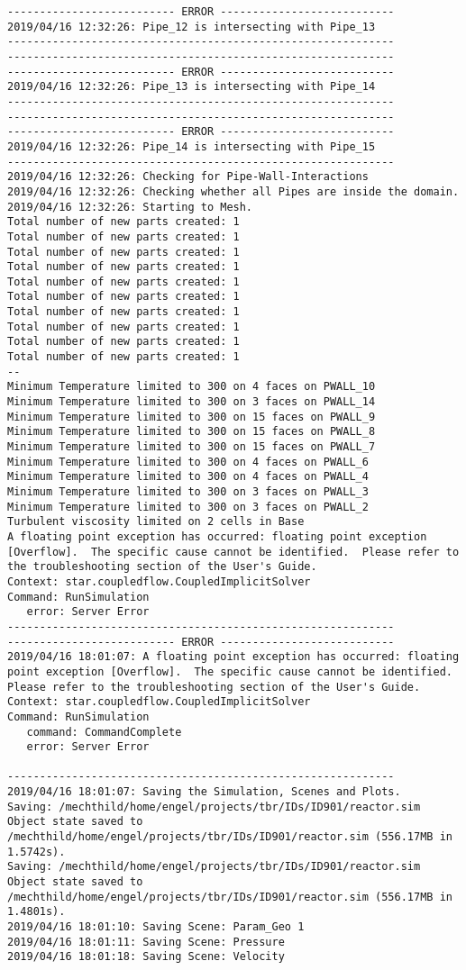 \documentclass{article}
\begin{document}
{\begin{verbatim}
-------------------------- ERROR ---------------------------
2019/04/16 12:32:26: Pipe_12 is intersecting with Pipe_13
------------------------------------------------------------
------------------------------------------------------------
-------------------------- ERROR ---------------------------
2019/04/16 12:32:26: Pipe_13 is intersecting with Pipe_14
------------------------------------------------------------
------------------------------------------------------------
-------------------------- ERROR ---------------------------
2019/04/16 12:32:26: Pipe_14 is intersecting with Pipe_15
------------------------------------------------------------
2019/04/16 12:32:26: Checking for Pipe-Wall-Interactions
2019/04/16 12:32:26: Checking whether all Pipes are inside the domain.
2019/04/16 12:32:26: Starting to Mesh.
Total number of new parts created: 1
Total number of new parts created: 1
Total number of new parts created: 1
Total number of new parts created: 1
Total number of new parts created: 1
Total number of new parts created: 1
Total number of new parts created: 1
Total number of new parts created: 1
Total number of new parts created: 1
Total number of new parts created: 1
--
Minimum Temperature limited to 300 on 4 faces on PWALL_10
Minimum Temperature limited to 300 on 3 faces on PWALL_14
Minimum Temperature limited to 300 on 15 faces on PWALL_9
Minimum Temperature limited to 300 on 15 faces on PWALL_8
Minimum Temperature limited to 300 on 15 faces on PWALL_7
Minimum Temperature limited to 300 on 4 faces on PWALL_6
Minimum Temperature limited to 300 on 4 faces on PWALL_4
Minimum Temperature limited to 300 on 3 faces on PWALL_3
Minimum Temperature limited to 300 on 3 faces on PWALL_2
Turbulent viscosity limited on 2 cells in Base
A floating point exception has occurred: floating point exception [Overflow].  The specific cause cannot be identified.  Please refer to the troubleshooting section of the User's Guide.
Context: star.coupledflow.CoupledImplicitSolver
Command: RunSimulation
   error: Server Error
------------------------------------------------------------
-------------------------- ERROR ---------------------------
2019/04/16 18:01:07: A floating point exception has occurred: floating point exception [Overflow].  The specific cause cannot be identified.  Please refer to the troubleshooting section of the User's Guide.
Context: star.coupledflow.CoupledImplicitSolver
Command: RunSimulation
   command: CommandComplete
   error: Server Error

------------------------------------------------------------
2019/04/16 18:01:07: Saving the Simulation, Scenes and Plots.
Saving: /mechthild/home/engel/projects/tbr/IDs/ID901/reactor.sim
Object state saved to /mechthild/home/engel/projects/tbr/IDs/ID901/reactor.sim (556.17MB in 1.5742s).
Saving: /mechthild/home/engel/projects/tbr/IDs/ID901/reactor.sim
Object state saved to /mechthild/home/engel/projects/tbr/IDs/ID901/reactor.sim (556.17MB in 1.4801s).
2019/04/16 18:01:10: Saving Scene: Param_Geo 1
2019/04/16 18:01:11: Saving Scene: Pressure
2019/04/16 18:01:18: Saving Scene: Velocity
\end{verbatim}
}
\clearpage
\end{document}
